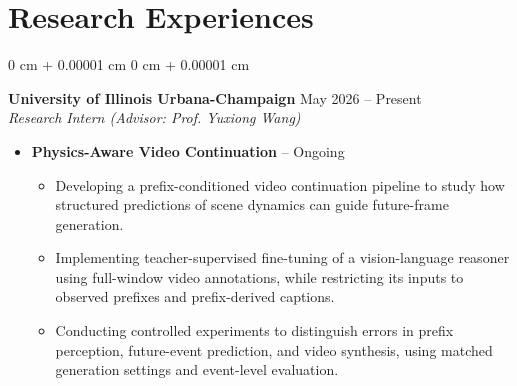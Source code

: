 \documentclass[11pt, letterpaper]{article}
\newenvironment{highlights}{
    \begin{itemize}[
        topsep=0 cm,
        parsep=0 cm,
        partopsep=0pt,
        itemsep=0pt,
        leftmargin=0 cm + 10pt
    ]
}{
    \end{itemize}
}
\newenvironment{onecolentry}{
    \begin{adjustwidth}{
        0 cm + 0.00001 cm
    }{
        0 cm + 0.00001 cm
    }
}{
    \end{adjustwidth}
}
\begin{document}
    \section{Research Experiences}

        \begin{onecolentry}
            \textbf{University of Illinois Urbana-Champaign} \hfill May 2026 -- Present \\
            \textit{Research Intern (Advisor: Prof. Yuxiong Wang)}

            \begin{highlights}

                \item \textbf{Physics-Aware Video Continuation} -- Ongoing
                \begin{itemize}
                    \item Developing a prefix-conditioned video continuation pipeline
                    to study how structured predictions of scene dynamics can guide
                    future-frame generation.

                    \item Implementing teacher-supervised fine-tuning of a
                    vision-language reasoner using full-window video annotations,
                    while restricting its inputs to observed prefixes and
                    prefix-derived captions.

                    \item Conducting controlled experiments to distinguish errors in
                    prefix perception, future-event prediction, and video synthesis,
                    using matched generation settings and event-level evaluation.
                \end{itemize}

            \end{highlights}
        \end{onecolentry}

        \vspace{0.15 cm}
\end{document}
